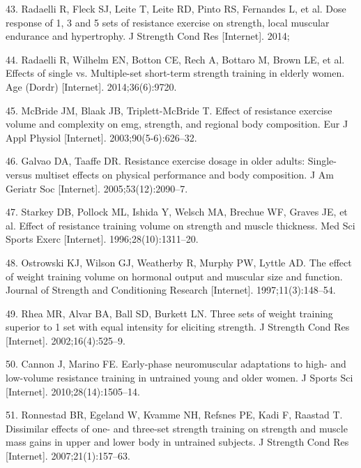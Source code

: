 \documentclass[twoside,10pt]{gihclass} %
\begin{document}
\leavevmode\hypertarget{ref-RN1570}{}%
43. Radaelli R, Fleck SJ, Leite T, Leite RD, Pinto RS, Fernandes L, et al. Dose response of 1, 3 and 5 sets of resistance exercise on strength, local muscular endurance and hypertrophy. J Strength Cond Res {[}Internet{]}. 2014;

\leavevmode\hypertarget{ref-RN1518}{}%
44. Radaelli R, Wilhelm EN, Botton CE, Rech A, Bottaro M, Brown LE, et al. Effects of single vs. Multiple-set short-term strength training in elderly women. Age (Dordr) {[}Internet{]}. 2014;36(6):9720.

\leavevmode\hypertarget{ref-RN1474}{}%
45. McBride JM, Blaak JB, Triplett-McBride T. Effect of resistance exercise volume and complexity on emg, strength, and regional body composition. Eur J Appl Physiol {[}Internet{]}. 2003;90(5-6):626--32.

\leavevmode\hypertarget{ref-RN1472}{}%
46. Galvao DA, Taaffe DR. Resistance exercise dosage in older adults: Single- versus multiset effects on physical performance and body composition. J Am Geriatr Soc {[}Internet{]}. 2005;53(12):2090--7.

\leavevmode\hypertarget{ref-RN1456}{}%
47. Starkey DB, Pollock ML, Ishida Y, Welsch MA, Brechue WF, Graves JE, et al. Effect of resistance training volume on strength and muscle thickness. Med Sci Sports Exerc {[}Internet{]}. 1996;28(10):1311--20.

\leavevmode\hypertarget{ref-RN1454}{}%
48. Ostrowski KJ, Wilson GJ, Weatherby R, Murphy PW, Lyttle AD. The effect of weight training volume on hormonal output and muscular size and function. Journal of Strength and Conditioning Research {[}Internet{]}. 1997;11(3):148--54.

\leavevmode\hypertarget{ref-RN1384}{}%
49. Rhea MR, Alvar BA, Ball SD, Burkett LN. Three sets of weight training superior to 1 set with equal intensity for eliciting strength. J Strength Cond Res {[}Internet{]}. 2002;16(4):525--9.

\leavevmode\hypertarget{ref-RN1382}{}%
50. Cannon J, Marino FE. Early-phase neuromuscular adaptations to high- and low-volume resistance training in untrained young and older women. J Sports Sci {[}Internet{]}. 2010;28(14):1505--14.

\leavevmode\hypertarget{ref-RN776}{}%
51. Ronnestad BR, Egeland W, Kvamme NH, Refsnes PE, Kadi F, Raastad T. Dissimilar effects of one- and three-set strength training on strength and muscle mass gains in upper and lower body in untrained subjects. J Strength Cond Res {[}Internet{]}. 2007;21(1):157--63.
\end{document}
